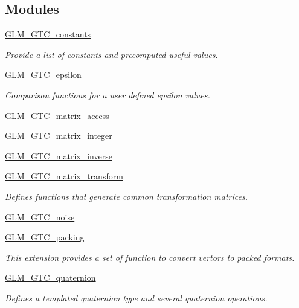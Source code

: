 \subsection*{Modules}
\begin{DoxyCompactItemize}
\item 
\hyperlink{group__gtc__constants}{G\+L\+M\+\_\+\+G\+T\+C\+\_\+constants}
\begin{DoxyCompactList}\small\item\em Provide a list of constants and precomputed useful values. \end{DoxyCompactList}\item 
\hyperlink{group__gtc__epsilon}{G\+L\+M\+\_\+\+G\+T\+C\+\_\+epsilon}
\begin{DoxyCompactList}\small\item\em Comparison functions for a user defined epsilon values. \end{DoxyCompactList}\item 
\hyperlink{group__gtc__matrix__access}{G\+L\+M\+\_\+\+G\+T\+C\+\_\+matrix\+\_\+access}
\item 
\hyperlink{group__gtc__matrix__integer}{G\+L\+M\+\_\+\+G\+T\+C\+\_\+matrix\+\_\+integer}
\item 
\hyperlink{group__gtc__matrix__inverse}{G\+L\+M\+\_\+\+G\+T\+C\+\_\+matrix\+\_\+inverse}
\item 
\hyperlink{group__gtc__matrix__transform}{G\+L\+M\+\_\+\+G\+T\+C\+\_\+matrix\+\_\+transform}
\begin{DoxyCompactList}\small\item\em Defines functions that generate common transformation matrices. \end{DoxyCompactList}\item 
\hyperlink{group__gtc__noise}{G\+L\+M\+\_\+\+G\+T\+C\+\_\+noise}
\item 
\hyperlink{group__gtc__packing}{G\+L\+M\+\_\+\+G\+T\+C\+\_\+packing}
\begin{DoxyCompactList}\small\item\em This extension provides a set of function to convert vertors to packed formats. \end{DoxyCompactList}\item 
\hyperlink{group__gtc__quaternion}{G\+L\+M\+\_\+\+G\+T\+C\+\_\+quaternion}
\begin{DoxyCompactList}\small\item\em Defines a templated quaternion type and several quaternion operations. \end{DoxyCompactList}\item 

\end{DoxyCompactItemize}
